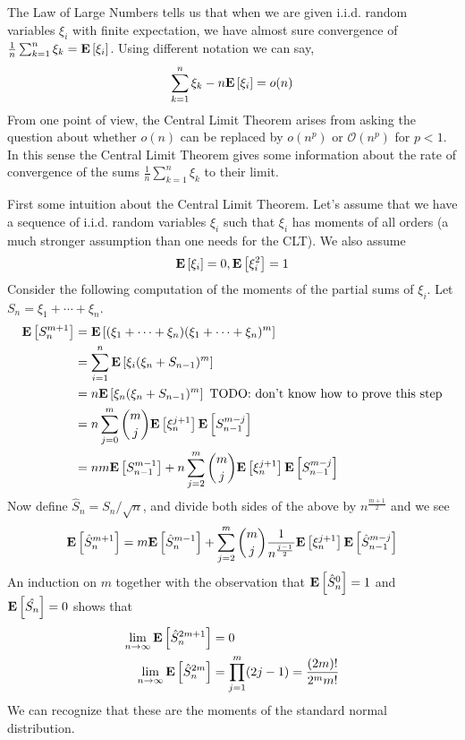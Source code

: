 \documentclass{amsart}
\theoremstyle{remark}
\theoremstyle{definition}
\begin{document}
The Law of Large Numbers tells us that when we are given i.i.d. random
variables $\xi_i$ with finite expectation, we have almost sure
convergence of $\frac{1}{n} \sum_{k=1}^n \xi_k =
\textbf{E}\left[\xi_i\right]$.  Using different notation we can say, 
\begin{align*}
\sum_{k=1}^n \xi_k - n \textbf{E}\left[\xi_i\right]  = o(n)
\end{align*}
From one point of view, the Central Limit Theorem arises from asking
the question about whether $o(n)$ can be replaced by $o(n^p)$ or
$\mathcal{O}(n^p)$ for $p < 1$.  In this sense the Central Limit
Theorem gives some information about the rate of convergence of the sums
$\frac{1}{n} \sum_{k=1}^n \xi_k$ to their limit.

First some intuition about the Central Limit Theorem.  Let's assume
that we have a sequence of i.i.d. random variables $\xi_i$ such that
$\xi_i$ has moments of all orders (a much stronger assumption than one
needs for the CLT).  We also assume 
\begin{align*}
\textbf{E}\left[\xi_i\right] = 0, \textbf{E}\left[\xi_i^2\right] =1
\end{align*}
Consider the following computation of the moments
of the partial sums of $\xi_i$.  Let $S_n = \xi_1 + \cdots + \xi_n$.
\begin{align*}
\textbf{E}\left[S_n^{m+1}\right] &= \textbf{E}\left[(\xi_1
  + \cdots + \xi_n) (\xi_1
  + \cdots + \xi_n)^{m}\right] \\
&= \sum_{i=1}^n \textbf{E}\left[\xi_i (\xi_n + S_{n-1})^m \right]\\
&= n \textbf{E}\left[\xi_n (\xi_n + S_{n-1})^m\right] \textrm{ TODO: don't know how
  to prove this step}\\
&= n \sum_{j=0}^m \binom{m}{j} \textbf{E}\left[\xi_n^{j+1}\right]
\textbf{E}\left[S_{n-1}^{m-j}\right] \\
&= n m \textbf{E}\left[S_{n-1}^{m-1}\right] + n \sum_{j=2}^m \binom{m}{j} \textbf{E}\left[\xi_n^{j+1}\right]
\textbf{E}\left[S_{n-1}^{m-j}\right] \\
\end{align*}
Now define $\hat{S}_n = S_n/\sqrt{n}$, and divide both sides of the
above by $n^{\frac{m+1}{2}}$ and we see
\begin{align*}
\textbf{E}\left[\hat{S}_n^{m+1}\right] = m \textbf{E}\left[\hat{S}_n^{m-1}\right] + \sum_{j=2}^m \binom{m}{j} \frac{1}{n^\frac{j-1}{2}}\textbf{E}\left[\xi_n^{j+1}\right]
\textbf{E}\left[\hat{S}_{n-1}^{m-j}\right]
\end{align*}
An induction on $m$ together with the observation that $\textbf{E}\left[\hat{S}_n^0\right] =
1$ and $\textbf{E}\left[\hat{S_n}\right] = 0$ shows that 
\begin{align*}
\lim_{n \to \infty} \textbf{E}\left[\hat{S}_n^{2m+1}\right]&=0 \\
\lim_{n \to \infty} \textbf{E}\left[\hat{S}_n^{2m}\right]&=\prod_{j=1}^m (2j-1)
= \frac{(2m)!}{2^m m!}\\
\end{align*}
We can recognize that these are the moments of the standard normal
distribution.
\end{document}
